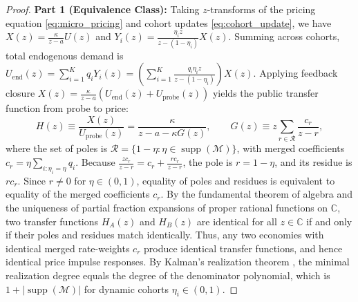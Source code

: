 \documentclass[12pt]{article}
\theoremstyle{definition}
\theoremstyle{remark}
\begin{document}
\begin{proof}
\textbf{Part 1 (Equivalence Class):} Taking $z$-transforms of the pricing equation \eqref{eq:micro_pricing} and cohort updates \eqref{eq:cohort_update}, we have $X(z) = \frac{\kappa}{z - a} U(z)$ and $Y_i(z) = \frac{\eta_i z}{z - (1 - \eta_i)} X(z)$. Summing across cohorts, total endogenous demand is $U_{\text{end}}(z) = \sum_{i=1}^K q_i Y_i(z) = \left( \sum_{i=1}^K \frac{q_i \eta_i z}{z - (1 - \eta_i)} \right) X(z)$. 
Applying feedback closure $X(z) = \frac{\kappa}{z - a} (U_{\text{end}}(z) + U_{\text{probe}}(z))$ yields the public transfer function from probe to price:
\begin{equation}
H(z) \equiv \frac{X(z)}{U_{\text{probe}}(z)} = \frac{\kappa}{z - a - \kappa G(z)}, \qquad G(z) \equiv z \sum_{r \in \mathcal{R}} \frac{c_r}{z - r},
\end{equation}
where the set of poles is $\mathcal{R} = \{1 - \eta : \eta \in \operatorname{supp}(\mathcal{M})\}$, with merged coefficients $c_r = \eta \sum_{i: \eta_i = \eta} q_i$. Because $\frac{z c_r}{z - r} = c_r + \frac{r c_r}{z - r}$, the pole is $r = 1 - \eta$, and its residue is $r c_r$. Since $r \neq 0$ for $\eta \in (0, 1)$, equality of poles and residues is equivalent to equality of the merged coefficients $c_r$. By the fundamental theorem of algebra and the uniqueness of partial fraction expansions of proper rational functions on $\mathbb{C}$, two transfer functions $H_A(z)$ and $H_B(z)$ are identical for all $z \in \mathbb{C}$ if and only if their poles and residues match identically. Thus, any two economies with identical merged rate-weights $c_r$ produce identical transfer functions, and hence identical price impulse responses. By Kalman's realization theorem \citep{kalman1960}, the minimal realization degree equals the degree of the denominator polynomial, which is $1 + |\operatorname{supp}(\mathcal{M})|$ for dynamic cohorts $\eta_i \in (0, 1)$.


\end{proof}
\end{document}
